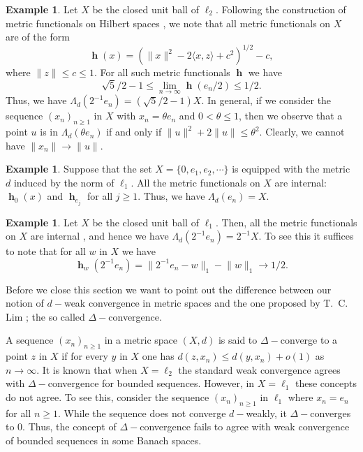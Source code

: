 \documentclass[a4paper,12pt]{article}
\theoremstyle{definition}
\newtheorem{ex}[thm]{Example}
\DeclareMathOperator{\h}{\mathbf{h}}
\newcommand{\norm}[1]{\lVert#1\rVert}
\newcommand{\dpair}[2]{\langle#1, #2\rangle}
\numberwithin{equation}{section}
\begin{document}
\begin{ex}  
Let $X$ be the closed unit ball of $\ell_2$. Following the construction of metric 
functionals on Hilbert spaces \cite{Gutierrez2019-2}, we note that all metric 
functionals on $X$ are of the form
$$
	\h(x)  = ( \norm{x}^2 - 2\dpair{x}{z} +c^2 )^{1/2} -c,
$$
where $\norm{z} \leq c \leq 1$. For all such metric functionals $\h$ we have  
$$
	\sqrt{5}/2 -1 \leq \lim_{n\to\infty} \h(e_n/2) \leq 1/2.
$$
Thus, we have $\Lambda_d(2^{-1}e_n) = (\sqrt{5}/2 -1)X$. In general, if we 
consider the sequence $(x_n)_{n\geq 1}$ in $X$ with $x_n = \theta e_n$ and 
$0<\theta\leq 1$, then we observe that a point $u$ is in $\Lambda_d(\theta e_n)$ 
if and only if $\norm{u}^2 + 2\norm{u} \leq \theta ^2$. Clearly, we cannot have 
$\norm{x_n} \rightarrow \norm{u}$.
\end{ex} 

\begin{ex}
Suppose that the set $X=\{ 0, e_1, e_2, \cdots \}$ is equipped 
with the metric $d$ induced by the norm of $\ell_1$. All the metric functionals
on $X$ are internal: $\h_0(x)$ and $\h_{e_j}$ for all $j\geq 1$. Thus, we have 
$\Lambda_d(e_n) = X$.
\end{ex}

\begin{ex}  
Let $X$ be the closed unit ball of $\ell_1$. Then, all the metric functionals 
on $X$ are internal \cite{Gutierrez2019-2}, and hence we have 
$\Lambda_d(2^{-1}e_n) = 2^{-1}X$. To see this it suffices to note that for all 
$w$ in $X$ we have
$$
	\h_w(2^{-1}e_n) = \norm{2^{-1}e_n -w}_{1} - \norm{w}_{1} \rightarrow  1/2.
$$
\end{ex}

Before we close this section we want to point out the difference between our notion 
of $d-$weak convergence in metric spaces and the one proposed by T.~C. Lim \cite{Lim1977}; 
the so called $\Delta-$convergence.

A sequence $(x_n)_{n\geq 1}$ in a metric space $(X,d)$ is said to $\Delta-$converge
to a point $z$ in $X$ if  for every $y$ in $X$ one has $d(z, x_n) \leq d(y, x_n) + o(1)$
as $n\to\infty$. It is known that when $X=\ell_2$ the standard weak convergence 
agrees with $\Delta-$convergence for bounded sequences. However, in $X=\ell_1$ these 
concepts do not agree. To see this, consider the sequence $(x_n)_{n\geq 1}$ in
$\ell_1$ where $x_n = e_n$ for all $n\geq 1$. While the sequence does not converge 
$d-$weakly, it $\Delta-$converges to $0$. Thus, the concept of $\Delta-$convergence 
fails to agree with weak convergence of bounded sequences in some Banach spaces. 
\end{document}
